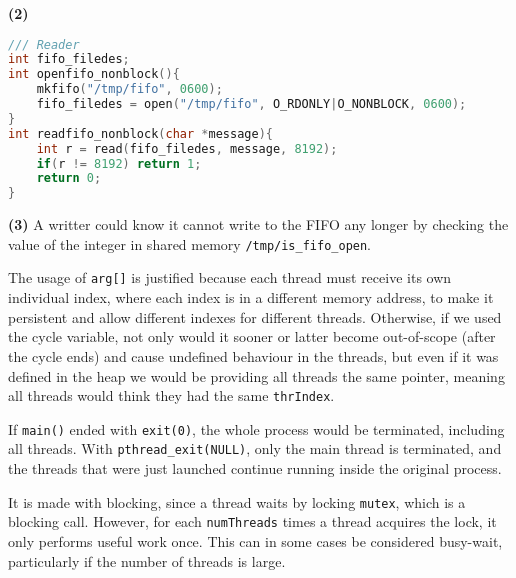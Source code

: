 \documentclass{sope}
\begin{document}
{\textbf{(2)}
\begin{lstlisting}[language=C]
/// Reader
int fifo_filedes;
int openfifo_nonblock(){
    mkfifo("/tmp/fifo", 0600);
    fifo_filedes = open("/tmp/fifo", O_RDONLY|O_NONBLOCK, 0600);
}
int readfifo_nonblock(char *message){
    int r = read(fifo_filedes, message, 8192);
    if(r != 8192) return 1;
    return 0;
}
\end{lstlisting}
\textbf{(3)}
A writter could know it cannot write to the FIFO any longer by checking the value of the integer in shared memory \texttt{/tmp/is\_fifo\_open}.

The usage of \texttt{arg[]} is justified because each thread must receive its own individual index, where each index is in a different memory address, to make it persistent and allow different indexes for different threads. Otherwise, if we used the cycle variable, not only would it sooner or latter become out-of-scope (after the cycle ends) and cause undefined behaviour in the threads, but even if it was defined in the heap we would be providing all threads the same pointer, meaning all threads would think they had the same \texttt{thrIndex}.

If \texttt{main()} ended with \texttt{exit(0)}, the whole process would be terminated, including all threads. With \texttt{pthread\_exit(NULL)}, only the main thread is terminated, and the threads that were just launched continue running inside the original process.

It is made with blocking, since a thread waits by locking \texttt{mutex}, which is a blocking call. However, for each \texttt{numThreads} times a thread acquires the lock, it only performs useful work once. This can in some cases be considered busy-wait, particularly if the number of threads is large.



}
\end{document}

